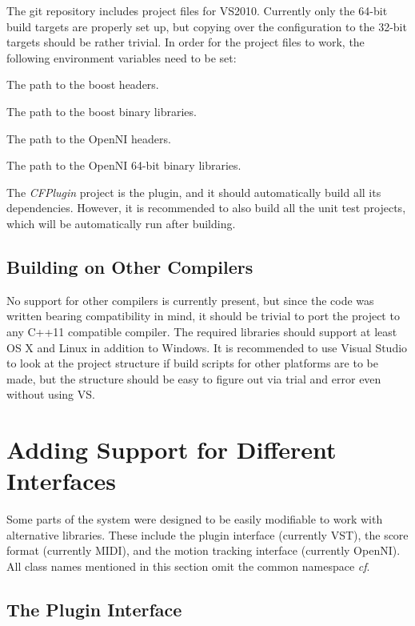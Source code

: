 \documentclass[12pt,a4paper]{article}
\begin{document}
The git repository includes project files for VS2010.
Currently only the 64-bit build targets are properly set up,
but copying over the configuration to the 32-bit targets
should be rather trivial.
In order for the project files to work,
the following environment variables need to be set:
\begin{description}[leftmargin=32ex]
\item[BOOST\_INCLUDE] The path to the boost headers.
\item[BOOST\_LIB] The path to the boost binary libraries.
\item[OPEN\_NI\_INCLUDE]  The path to the OpenNI headers.
\item[OPEN\_NI\_LIB64] The path to the OpenNI 64-bit binary libraries.
\end{description}

The \textit{CFPlugin} project is the plugin,
and it should automatically build all its dependencies.
However, it is recommended to also build all the unit test projects,
which will be automatically run after building.

\subsection{Building on Other Compilers}

No support for other compilers is currently present,
but since the code was written bearing compatibility in mind,
it should be trivial to port the project to any
C++11 compatible compiler.
The required libraries should support at least
OS X and Linux in addition to Windows.
It is recommended to use Visual Studio to
look at the project structure if build scripts for other
platforms are to be made,
but the structure should be easy to figure
out via trial and error even without using VS.

\section{Adding Support for Different Interfaces}

Some parts of the system were designed to be easily
modifiable to work with alternative libraries.
These include the plugin interface (currently VST),
the score format (currently MIDI),
and the motion tracking interface (currently OpenNI).
All class names mentioned in this section
omit the common namespace \textit{cf}.

\subsection{The Plugin Interface}
\end{document}
